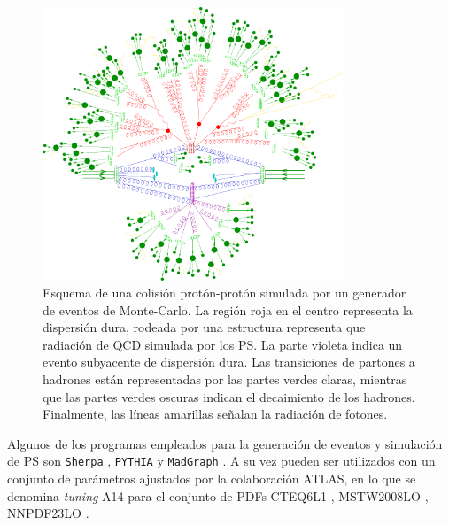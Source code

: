 \begin{figure}
  \centering
  \includegraphics[width=0.8\textwidth]{images/lhc/mc_qcd.pdf}
  \caption{Esquema de una colisión protón-protón simulada por un generador de
eventos de Monte-Carlo. La región roja en el centro representa la dispersión dura,
rodeada por una estructura representa que radiación de QCD
simulada por los PS. La parte violeta indica un evento subyacente 
de dispersión dura. Las transiciones de partones a hadrones están representadas
por las partes verdes claras, mientras que las partes verdes oscuras indican el 
decaimiento de los hadrones. Finalmente, las líneas amarillas señalan la radiación de
fotones\cite{mc_simulation}.}
\label{fig:mc_qcd}
\end{figure}

Algunos de los programas empleados para la generación de eventos y simulación de PS son \texttt{Sherpa} \cite{SherpaGen, Schumann:2007mg, Bothmann:2019yzt}, \texttt{PYTHIA} \cite{Sjostrand:2014zea} y \texttt{MadGraph} \cite{Alwall:2014hca}. A su vez pueden ser utilizados con un conjunto de parámetros ajustados por la colaboración ATLAS, en lo que se denomina \textit{tuning} A14 \cite{ATL-PHYS-PUB-2014-021} para el conjunto de PDFs CTEQ6L1 \cite{cteq}, MSTW2008LO \cite{mstw1, mstw2, mstw3}, NNPDF23LO \cite{nnpdf}. 


